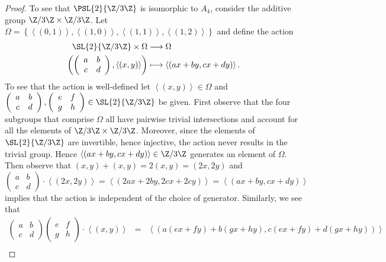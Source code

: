\documentclass[10pt]{amsart}
\begin{document}
\begin{thm}
\begin{proof}
    To see that $\PSL{2}{\Z/3\Z}$ is isomorphic to $A_4$, consider the additive group $\Z/3\Z \times \Z/3\Z$. 
    Let $\Omega = \left\{\left<(0,1)\right>, \left<(1,0)\right>, \left<(1,1)\right>, \left<(1,2)\right>\right\}$ and define the action 
    \begin{align*}
      \SL{2}{\Z/3\Z} \times \Omega &\longrightarrow \Omega\\
      \left(\left(\begin{array}{cc}
        a & b\\
        c & d
      \end{array}\right), \left< (x,y) \right>\right) &\longmapsto \left<(ax + by, cx + dy)\right>.
    \end{align*}
    To see that the action is well-defined let $\left<(x,y)\right> \in \Omega$ and $\left(\begin{array}{cc}
      a & b\\
      c & d
      \end{array}\right), \left(\begin{array}{cc}
      e & f\\
      g & h
      \end{array}\right) \in \SL{2}{\Z/3\Z}$ be given.
    First observe that the four subgroups that comprise $\Omega$ all have pairwise trivial intersections and account for all the elements of $\Z/3\Z \times \Z/3\Z$.
    Moreover, since the elements of $\SL{2}{\Z/3\Z}$ are invertible, hence injective, the action never results in the trivial group.
    Hence $\left<(ax + by, cx + dy)\right> \in \Z/3\Z$ generates an element of $\Omega$.
    Then observe that $(x,y) + (x,y) = 2(x, y) = (2x, 2y)$ and 
    $$\left(\begin{array}{cc}
      a & b\\
      c & d
      \end{array}\right) \cdot \left<(2x,2y)\right> = \left<(2ax + 2by, 2cx + 2cy)\right> = \left<(ax + by, cx + dy)\right>$$
    implies that the action is independent of the choice of generator.
    Similarly, we see that
    \begin{eqnarray*}
      \left(\begin{array}{cc}
      a & b\\
      c & d
      \end{array}\right)
    \left(\begin{array}{cc}
      e & f\\
      g & h
    \end{array}\right) \cdot \left<(x,y)\right> &=& \left<(a(ex + fy) + b(gx + hy), c(ex + fy) + d(gx + hy))\right>\\

\end{eqnarray*}
\end{proof}
\end{thm}
\end{document}
